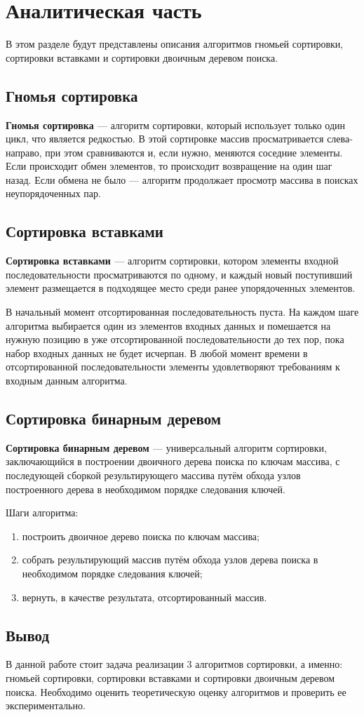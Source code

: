 \chapter{Аналитическая часть}
В этом разделе будут представлены описания алгоритмов гномьей сортировки, сортировки вставками и сортировки двоичным деревом поиска.

\section{Гномья сортировка}

\textbf{Гномья сортировка \cite{Knut}} ---  алгоритм сортировки, который использует только один цикл, что является редкостью. В этой сортировке массив просматривается слева-направо, при этом сравниваются и, если нужно, меняются соседние элементы. Если происходит обмен элементов, то происходит возвращение на один шаг назад. Если обмена не было --- алгоритм продолжает просмотр массива в поисках неупорядоченных пар.


\section{Сортировка вставками}

\textbf{Сортировка вставками \cite{insert}} --- алгоритм сортировки, котором элементы входной последовательности просматриваются по одному, и каждый новый поступивший элемент размещается в подходящее место среди ранее упорядоченных элементов.

В начальный момент отсортированная последовательность пуста. На каждом шаге алгоритма выбирается один из элементов входных данных и помешается на нужную позицию в уже отсортированной последовательности до тех пор, пока набор входных данных не будет исчерпан. В любой момент времени в отсортированной последовательности элементы удовлетворяют требованиям к входным данным алгоритма.

\section{Сортировка бинарным деревом}

\textbf{Сортировка бинарным деревом \cite{Knut}} --- универсальный алгоритм сортировки, заключающийся в построении двоичного дерева поиска по ключам массива, с последующей сборкой результирующего массива путём обхода узлов построенного дерева в необходимом порядке следования ключей.

Шаги алгоритма:
\begin{enumerate}[label=\arabic*)]
	\item построить двоичное дерево поиска по ключам массива;
	\item собрать результирующий массив путём обхода узлов дерева поиска в необходимом порядке следования ключей;
	\item вернуть, в качестве результата, отсортированный массив.
\end{enumerate}

\section*{Вывод}

В данной работе стоит задача реализации 3 алгоритмов сортировки, а именно: гномьей сортировки, сортировки вставками и сортировки двоичным деревом поиска. Необходимо оценить теоретическую оценку алгоритмов и проверить ее экспериментально.


